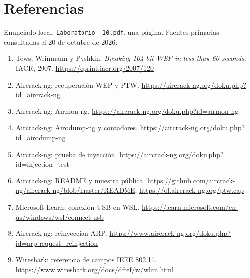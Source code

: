 \documentclass[11pt,a4paper]{article}
\begin{document}
\section*{Referencias}
\small
Enunciado local: \texttt{Laboratorio\_\_10.pdf}, una página. Fuentes primarias
consultadas el 20 de octubre de 2026:
\begin{enumerate}
\item Tews, Weinmann y Pyshkin. \textit{Breaking 104 bit WEP in less than
60 seconds}. IACR, 2007. \url{https://eprint.iacr.org/2007/120}
\item Aircrack-ng: recuperación WEP y PTW.
\url{https://aircrack-ng.org/doku.php?id=aircrack-ng}
\item Aircrack-ng: Airmon-ng.
\url{https://aircrack-ng.org/doku.php?id=airmon-ng}
\item Aircrack-ng: Airodump-ng y contadores.
\url{https://aircrack-ng.org/doku.php?id=airodump-ng}
\item Aircrack-ng: prueba de inyección.
\url{https://aircrack-ng.org/doku.php?id=injection_test}
\item Aircrack-ng: README y muestra pública.
\url{https://github.com/aircrack-ng/aircrack-ng/blob/master/README};
\url{https://dl.aircrack-ng.org/ptw.cap}
\item Microsoft Learn: conexión USB en WSL.
\url{https://learn.microsoft.com/en-us/windows/wsl/connect-usb}
\item Aircrack-ng: reinyección ARP.
\url{https://www.aircrack-ng.org/doku.php?id=arp-request_reinjection}
\item Wireshark: referencia de campos IEEE 802.11.
\url{https://www.wireshark.org/docs/dfref/w/wlan.html}
\end{enumerate}
\end{document}
